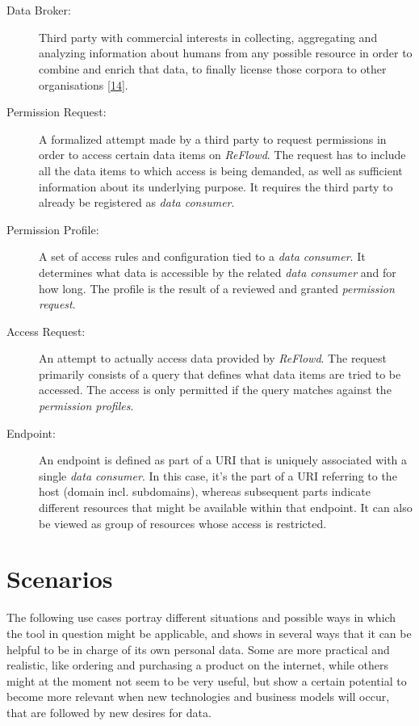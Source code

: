 \documentclass[12pt,english,a4paper,titlepage,cleardoublepage=empty,dottedtoc]{report}
\begin{document}
~\\
\hspace*{0.333em}\\

\begin{description}
\item[\protect\hypertarget{terminologies--data-broker}{}{Data Broker}:]
Third party with commercial interests in collecting, aggregating and
analyzing information about humans from any possible resource in order
to combine and enrich that data, to finally license those corpora to
other organisations
{[}\protect\hyperlink{ref-report_2014_data-brokers}{14}{]}.
\item[Permission Request:]
A formalized attempt made by a third party to request permissions in
order to access certain data items on \emph{ReFlowd}. The request has to
include all the data items to which access is being demanded, as well as
sufficient information about its underlying purpose. It requires the
third party to already be registered as \emph{data consumer}.
\item[Permission Profile:]
A set of access rules and configuration tied to a \emph{data consumer}.
It determines what data is accessible by the related \emph{data
consumer} and for how long. The profile is the result of a reviewed and
granted \emph{permission request}.
\item[Access Request:]
An attempt to actually access data provided by \emph{ReFlowd}. The
request primarily consists of a query that defines what data items are
tried to be accessed. The access is only permitted if the query matches
against the \emph{permission profiles}.
\item[Endpoint:]
An endpoint is defined as part of a URI that is uniquely associated with
a single \emph{data consumer}. In this case, it's the part of a URI
referring to the host (domain incl. subdomains), whereas subsequent
parts indicate different resources that might be available within that
endpoint. It can also be viewed as group of resources whose access is
restricted.
\end{description}

\hypertarget{scenarios}{\section{Scenarios}\label{scenarios}}

The following use cases portray different situations and possible ways
in which the tool in question might be applicable, and shows in several
ways that it can be helpful to be in charge of its own personal data.
Some are more practical and realistic, like ordering and purchasing a
product on the internet, while others might at the moment not seem to be
very useful, but show a certain potential to become more relevant when
new technologies and business models will occur, that are followed by
new desires for data.
\end{document}
